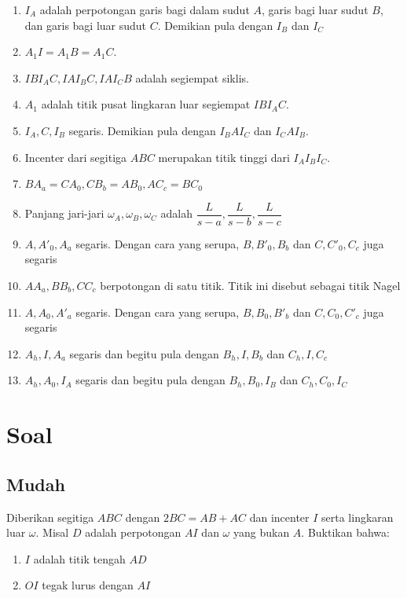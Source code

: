 \documentclass[11pt]{scrartcl}
\begin{document}
\begin{enumerate}
    \item $I_A$ adalah perpotongan garis bagi dalam sudut $A$, garis bagi luar sudut $B$, dan garis bagi luar sudut $C$. Demikian pula dengan $I_B$ dan $I_C$
    \item $A_1I = A_1B = A_1C$.
    \item $IBI_AC, IAI_BC, IAI_CB$ adalah segiempat siklis.
    \item $A_1$ adalah titik pusat lingkaran luar segiempat $IBI_AC$.
    \item $I_A,C,I_B$ segaris. Demikian pula dengan $I_BAI_C$ dan $I_CAI_B$.
    \item Incenter dari segitiga $ABC$ merupakan titik tinggi dari $I_AI_BI_C$.
    \item $BA_a = CA_0, CB_b = AB_0, AC_c = BC_0$
    \item Panjang jari-jari $\omega_A, \omega_B, \omega_C$ adalah $\dfrac{L}{s - a}, \dfrac{L}{s - b}, \dfrac{L}{s - c}$
    \item $A, A'_0, A_a$ segaris. Dengan cara yang serupa, $B, B'_0, B_b$ dan $C, C'_0, C_c$ juga segaris
    \item $AA_a, BB_b, CC_c$ berpotongan di satu titik. Titik ini disebut sebagai titik Nagel
    \item $A, A_0, A'_a$ segaris. Dengan cara yang serupa, $B, B_0, B'_b$ dan $C, C_0, C'_c$ juga segaris
    \item $A_h, I, A_a$ segaris dan begitu pula dengan $B_h, I, B_b$ dan $C_h, I, C_c$
    \item $A_h, A_0, I_A$ segaris dan begitu pula dengan $B_h, B_0, I_B$ dan $C_h, C_0, I_C$
\end{enumerate}

\section{Soal}
\subsection{Mudah}
\begin{problem}
     Diberikan segitiga $ABC$ dengan $2BC = AB + AC$ dan incenter $I$ serta lingkaran luar $\omega$. Misal $D$ adalah perpotongan $AI$ dan $\omega$ yang bukan $A$. Buktikan bahwa:
    \begin{enumerate}
        \item $I$ adalah titik tengah $AD$
        \item $OI$ tegak lurus dengan $AI$
    \end{enumerate}
\end{problem}
\end{document}
